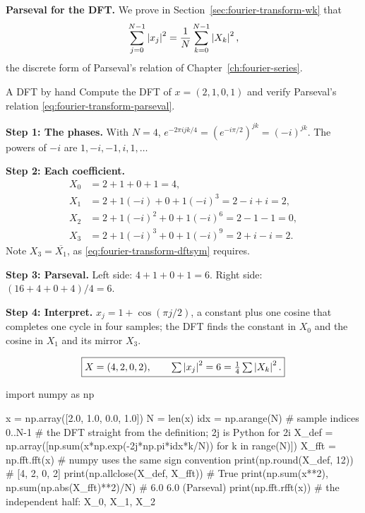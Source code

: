 \textbf{Parseval for the DFT.} We prove in Section~\ref{sec:fourier-transform-wk} that
\begin{equation}
\sum_{j=0}^{N-1}\left\lvert x_j\right\rvert^2=\frac1N\sum_{k=0}^{N-1}\left\lvert X_k\right\rvert^2,
\label{eq:fourier-transform-parseval}
\end{equation}
the discrete form of Parseval's relation of Chapter~\ref{ch:fourier-series}.

\begin{sample}{A DFT by hand}
Compute the DFT of $x=(2,1,0,1)$ and verify Parseval's relation \eqref{eq:fourier-transform-parseval}.

\textbf{Step 1: The phases.} With $N=4$, $e^{-2\pi ijk/4}=(e^{-i\pi/2})^{jk}=(-i)^{jk}$. The powers of $-i$ are $1,-i,-1,i,1,\dots$

\textbf{Step 2: Each coefficient.}
\begin{align*}
X_0&=2+1+0+1=4,\\
X_1&=2+1(-i)+0+1(-i)^3=2-i+i=2,\\
X_2&=2+1(-i)^2+0+1(-i)^6=2-1-1=0,\\
X_3&=2+1(-i)^3+0+1(-i)^9=2+i-i=2.
\end{align*}
Note $X_3=\overline{X_1}$, as \eqref{eq:fourier-transform-dftsym} requires.

\textbf{Step 3: Parseval.} Left side: $4+1+0+1=6$. Right side: $(16+4+0+4)/4=6$.

\textbf{Step 4: Interpret.} $x_j=1+\cos(\pi j/2)$, a constant plus one cosine that completes one cycle in four samples; the DFT finds the constant in $X_0$ and the cosine in $X_1$ and its mirror $X_3$.

\[\boxed{X=(4,2,0,2),\qquad\textstyle\sum\left\lvert x_j\right\rvert^2=6=\frac14\sum\left\lvert X_k\right\rvert^2.}\]
\end{sample}

\begin{pycode}
import numpy as np

x = np.array([2.0, 1.0, 0.0, 1.0])
N = len(x)
idx = np.arange(N)                    # sample indices 0..N-1
# the DFT straight from the definition; 2j is Python for 2i
X_def = np.array([np.sum(x*np.exp(-2j*np.pi*idx*k/N)) for k in range(N)])
X_fft = np.fft.fft(x)                 # numpy uses the same sign convention
print(np.round(X_def, 12))            # [4, 2, 0, 2]
print(np.allclose(X_def, X_fft))      # True
print(np.sum(x**2), np.sum(np.abs(X_fft)**2)/N)   # 6.0 6.0 (Parseval)
print(np.fft.rfft(x))                 # the independent half: X_0, X_1, X_2
\end{pycode}

